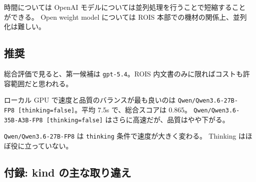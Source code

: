\documentclass[
]{article}
\begin{document}
時間については OpenAI
モデルについては並列処理を行うことで短縮することができる。 Open weight
model については ROIS 本部での機材の関係上、並列化は難しい。

\subsection{推奨}\label{ux63a8ux5968}

総合評価で見ると、第一候補は \texttt{gpt-5.4}。ROIS
内文書のみに限ればコストも許容範囲だと思われる。

ローカル GPU で速度と品質のバランスが最も良いのは
\texttt{Qwen/Qwen3.6-27B-FP8\ {[}thinking=false{]}}。平均 7.5s
で、総合スコアは 0.865。
\texttt{Qwen/Qwen3.6-35B-A3B-FP8\ {[}thinking=false{]}}
はさらに高速だが、品質はやや下がる。

\texttt{Qwen/Qwen3.6-27B-FP8} は \texttt{thinking}
条件で速度が大きく変わる。 Thinking はほぼ役に立っていない。

\subsection{付録: kind
の主な取り違え}\label{ux4ed8ux9332-kind-ux306eux4e3bux306aux53d6ux308aux9055ux3048}
\end{document}
